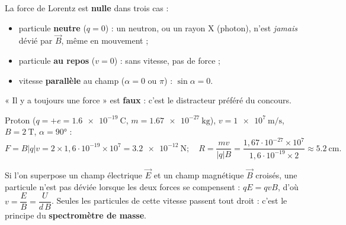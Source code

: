 \documentclass[11pt,a4paper]{article}
\newcommand{\vv}[1]{\vec{#1}}\newcommand{\ds}{\displaystyle}
\begin{document}
\begin{piege}
La force de Lorentz est \textbf{nulle} dans trois cas :
\begin{itemize}[leftmargin=1.5em,topsep=1pt,itemsep=0pt]
  \item particule \textbf{neutre} ($q=0$) : un neutron, ou un rayon X (photon), n'est \emph{jamais}
        dévié par $\vv{B}$, même en mouvement ;
  \item particule \textbf{au repos} ($v=0$) : sans vitesse, pas de force ;
  \item vitesse \textbf{parallèle} au champ ($\alpha=0$ ou $\pi$) : $\sin\alpha=0$.
\end{itemize}
« Il y a toujours une force » est \textbf{faux} : c'est le distracteur préféré du concours.
\end{piege}

\begin{exemplebox}
Proton ($q=+e=\qty{1.6e-19}{\coulomb}$, $m=\qty{1.67e-27}{\kilogram}$), $v=\qty{1e7}{\metre\per\second}$,
$B=\qty{2}{\tesla}$, $\alpha=\ang{90}$ :
\[ F=B|q|v=2\times1{,}6\cdot10^{-19}\times10^{7}=\qty{3.2e-12}{\newton};\quad
   R=\frac{mv}{|q|B}=\frac{1{,}67\cdot10^{-27}\times10^{7}}{1{,}6\cdot10^{-19}\times2}\approx\qty{5.2}{\centi\metre}. \]
\end{exemplebox}

\begin{remarque}
Si l'on superpose un champ électrique $\vv{E}$ et un champ magnétique $\vv{B}$ croisés, une particule
n'est pas déviée lorsque les deux forces se compensent : $qE=qvB$, d'où $\boxed{v=\dfrac{E}{B}=\dfrac{U}{d\,B}}$.
Seules les particules de cette vitesse passent tout droit : c'est le principe du \textbf{spectromètre
de masse}.
\end{remarque}
\end{document}

